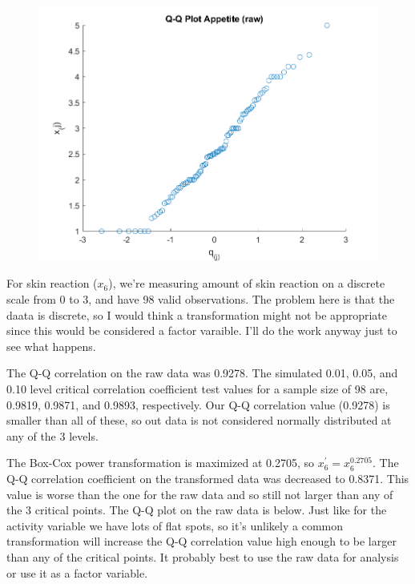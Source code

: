\begin{center}
    \begin{figure}[H]
        \centering
        \includegraphics[scale=0.6]{./matlab/chapter-4/sol4.32.qq.5.png}
    \end{figure}
\end{center}

For skin reaction ($x_{6}$), we're measuring amount of skin reaction on a discrete scale from 0 to 3, and have 98 valid observations. The problem here is that the daata is discrete, so I would think a transformation might not be appropriate since this would be considered a factor varaible. I'll do the work anyway just to see what happens.

The Q-Q correlation on the raw data was 0.9278. The simulated 0.01, 0.05, and 0.10 level critical correlation coefficient test values for a sample size of 98 are, 0.9819, 0.9871, and 0.9893, respectively. Our Q-Q correlation value (0.9278) is smaller than all of these, so out data is not considered normally distributed at any of the 3 levels.

The Box-Cox power transformation is maximized at 0.2705, so $x_{6}^{\prime} = x_{6}^{0.2705}$. The Q-Q correlation coefficient on the transformed data was decreased to 0.8371. This value is worse than the one for the raw data and so still not larger than any of the 3 critical points. The Q-Q plot on the raw data is below. Just like for the activity variable we have lots of flat spots, so it's unlikely a common transformation will increase the Q-Q correlation value high enough to be larger than any of the critical points. It probably best to use the raw data for analysis or use it as a factor variable.


